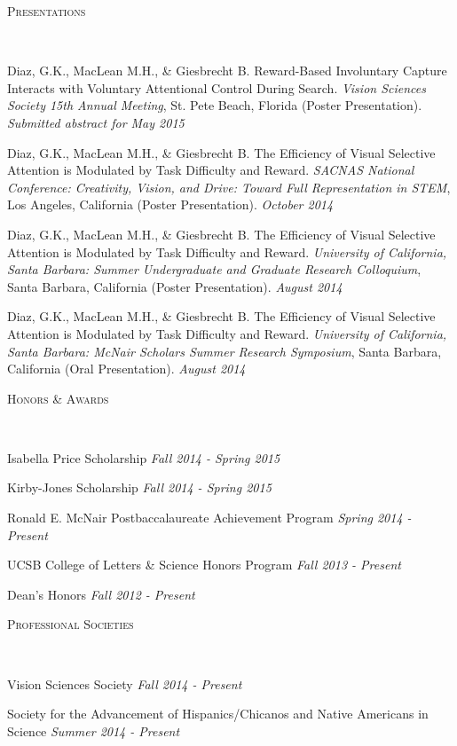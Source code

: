 \documentclass[10pt]{article}
\newenvironment{changemargin}[2]{%
  \begin{list}{}{%
    \setlength{\topsep}{0pt}%
    \setlength{\leftmargin}{#1}%
    \setlength{\rightmargin}{#2}%
    \setlength{\listparindent}{\parindent}%
    \setlength{\itemindent}{\parindent}%
    \setlength{\parsep}{\parskip}%
  }%
  \item[]}{\end{list}
}
\newcommand{\lineover}{
	\begin{changemargin}{-0.05in}{-0.05in}
		\vspace*{-8pt}
		\hrulefill \\
		\vspace*{-2pt}
	\end{changemargin}
}
\newcommand{\header}[1]{
	\begin{changemargin}{-0.5in}{-0.5in}
		\scshape{#1}\\
  	\lineover
	\end{changemargin}
}
\newcommand{\presentation}[2]{
	{#1} \hfill \emph{#2}\\ \bigskip
}
\newcommand{\award}[2]{
	{#1} \hfill \emph{#2}\\ \medskip
}
\newcommand{\society}[2]{
	{#1} \hfill \emph{#2}\\ \medskip
}
\newenvironment{body} {
	\vspace*{-16pt}
	\begin{changemargin}{-0.25in}{-0.5in}
  }
	{\end{changemargin}
}
\begin{document}
\medskip


\header{Presentations}

\begin{body}
	\vspace{14pt}

\presentation{Diaz, G.K., MacLean M.H., \& Giesbrecht B. Reward-Based Involuntary Capture Interacts with Voluntary Attentional Control During Search. \emph{Vision Sciences Society 15th Annual Meeting}, St. Pete Beach, Florida (Poster Presentation).}{Submitted abstract for May 2015}

\presentation{Diaz, G.K., MacLean M.H., \& Giesbrecht B. The Efficiency of Visual Selective Attention is Modulated by Task Difficulty and Reward. \emph {SACNAS National Conference: Creativity, Vision, and Drive: Toward Full Representation in STEM}, Los Angeles, California (Poster Presentation).}{October 2014}

\presentation{Diaz, G.K., MacLean M.H., \& Giesbrecht B. The Efficiency of Visual Selective Attention is Modulated by Task Difficulty and Reward. \emph {University of California, Santa Barbara: Summer Undergraduate and Graduate Research Colloquium}, Santa Barbara, California (Poster Presentation).}{August 2014}

\presentation{Diaz, G.K., MacLean M.H., \& Giesbrecht B. The Efficiency of Visual Selective Attention is Modulated by Task Difficulty and Reward. \emph {University of California, Santa Barbara: McNair Scholars Summer Research Symposium}, Santa Barbara, California (Oral Presentation).}{August 2014}

\end{body}

\medskip


\header{Honors \& Awards}

\begin{body}
	\vspace{14pt}

\award{Isabella Price Scholarship}{Fall 2014 - Spring 2015}
\award{Kirby-Jones Scholarship}{Fall 2014 - Spring 2015}
\award{Ronald E. McNair Postbaccalaureate Achievement Program}{Spring 2014 - Present}
\award{UCSB College of Letters \& Science Honors Program}{Fall 2013 - Present}
\award{Dean's Honors}{Fall 2012 - Present}

\end{body}

\medskip


\header{Professional Societies}

\begin{body}
	\vspace{14pt}

\society{Vision Sciences Society}{Fall 2014 - Present}
\society{Society for the Advancement of Hispanics/Chicanos and Native Americans in Science}{Summer 2014 - Present}

\end{body}
\end{document}
